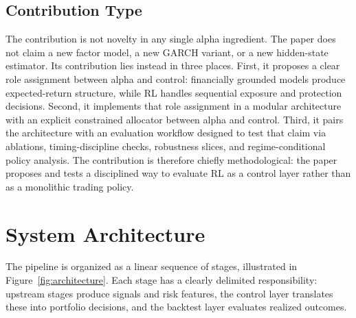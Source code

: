 \documentclass[10pt,twocolumn]{article}
\begin{document}
\subsection{Contribution Type}

The contribution is not novelty in any single alpha ingredient. The paper does
not claim a new factor model, a new GARCH variant, or a new hidden-state
estimator. Its contribution lies instead in three places. First, it proposes a
clear role assignment between alpha and control: financially grounded models
produce expected-return structure, while RL handles sequential exposure and
protection decisions. Second, it implements that role assignment in a modular
architecture with an explicit constrained allocator between alpha and control.
Third, it pairs the architecture with an evaluation workflow designed to test
that claim via ablations, timing-discipline checks, robustness slices, and
regime-conditional policy analysis.
The contribution is therefore chiefly methodological: the paper proposes and
tests a disciplined way to evaluate RL as a control layer rather than as a
monolithic trading policy.

\section{System Architecture}

The pipeline is organized as a linear sequence of stages, illustrated in
Figure~\ref{fig:architecture}. Each stage has a clearly delimited responsibility:
upstream stages produce signals and risk features, the control layer translates
these into portfolio decisions, and the backtest layer evaluates realized
outcomes.
\end{document}
